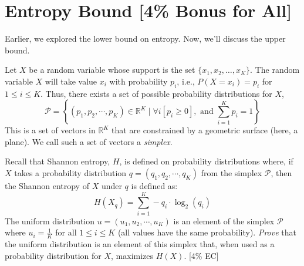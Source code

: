 \section{Entropy Bound [4\% Bonus for All]}

Earlier, we explored the lower bound on entropy. Now, we'll discuss the upper bound.

\bigskip Let $X$ be a random variable whose support is the set $\{x_1, x_2, \dots, x_K\}$. The random variable $X$ will take value $x_i$ with probability $p_i$, i.e., $P(X = x_i) = p_i$ for $1\leq i\leq K$. Thus, there exists a set of possible probability distributions for $X$,
$$\mathcal{P}=\left\{(p_1, p_2,\cdots, p_K)\in \mathbb{R}^K \;\Bigg\vert\; \forall i [p_i\geq 0], \text{ and }\sum_{i=1}^K p_i=1\right\}$$
This is a set of vectors in $\mathbb{R}^K$ that are constrained by a geometric surface (here, a plane). We call such a set of vectors a \textit{simplex}.

\smallskip Recall that Shannon entropy, $H$, is defined on probability distributions where, if $X$ takes a probability distribution $q=(q_1, q_2, \cdots, q_K)$ from the simplex $\mathcal{P}$, then the Shannon entropy of $X$ under $q$ is defined as:
$$H(X_q)=\sum_{i=1}^K -q_i\cdot\log_2(q_i)$$
The uniform distribution $u=(u_1, u_2, \cdots, u_K)$ is an element of the simplex $\mathcal{P}$ where $u_i=\frac{1}{K}$ for all $1\leq i\leq K$ (all values have the same probability). \emph{Prove} that the uniform distribution is an element of this simplex that, when used as a probability distribution for $X$, maximizes $H(X)$. [4\% EC]
